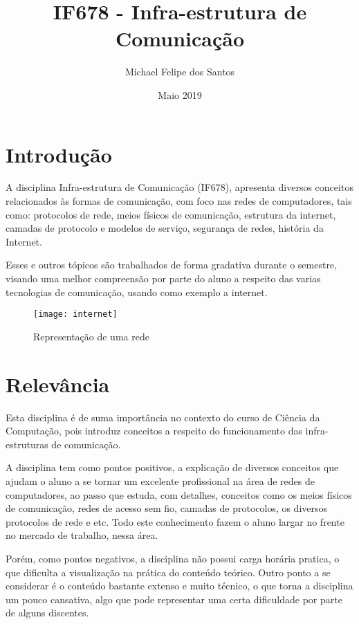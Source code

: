 \documentclass[10pt]{article}
\title{IF678 - Infra-estrutura de Comunicação}
\author{Michael Felipe dos Santos }
\date{Maio 2019}
\begin{document}
\maketitle

\section{Introdução}
A disciplina Infra-estrutura de Comunicação (IF678), apresenta diversos conceitos relacionados às formas de comunicação, com foco nas redes de computadores, tais como: protocolos de rede,  meios físicos de comunicação, estrutura da internet, camadas de protocolo e modelos de serviço, segurança de redes, história da Internet.
\cite{sitedadisciplina}

Esses e outros tópicos são trabalhados de forma gradativa durante o semestre, visando uma melhor compreensão por parte do aluno a respeito das varias tecnologias de comunicação, usando como exemplo a internet.

\begin{figure}[h!]
    \centering
    \texttt{[image: internet]}
    \caption{Representação de uma rede \cite{figura1}}
    \label{fig:internet}
\end{figure}



\section{Relevância}
Esta disciplina é de suma importância no contexto do curso de Ciência da Computação, pois introduz conceitos a respeito do funcionamento das infra-estruturas de comunicação.

A disciplina tem como pontos positivos, a explicação de diversos conceitos que ajudam o aluno a se tornar um excelente profissional na área de redes de computadores, ao passo que estuda, com detalhes, conceitos como os meios físicos de comunicação, redes de acesso sem fio, camadas de protocolos, os diversos protocolos de rede e etc. \cite{slide} Todo este conhecimento fazem o aluno largar no frente no mercado de trabalho, nessa área.

Porém, como pontos negativos, a disciplina não possui carga horária pratica,\cite{gradecurricular} o que dificulta a visualização na prática do conteúdo teórico. Outro ponto a se considerar é o conteúdo bastante extenso e muito técnico, o que torna a disciplina um pouco cansativa, algo que pode representar uma certa dificuldade por parte de alguns discentes.
\end{document}
